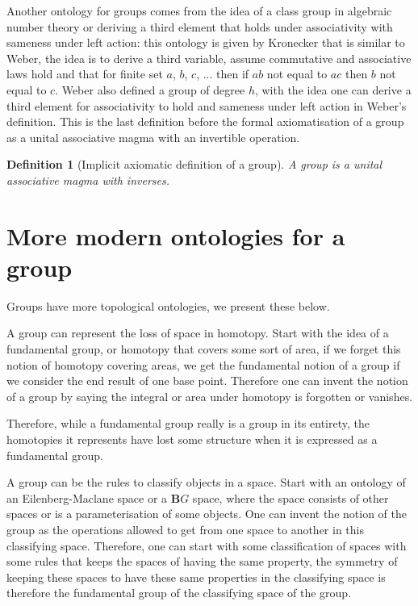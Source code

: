 \documentclass{tufte-book}
\newtheorem{definition}[theorem]{Definition}
\begin{document}
Another ontology for groups comes from the idea of a class group in algebraic number theory or deriving a third element that holds under associativity with sameness under left action: this ontology is given by Kronecker that is similar to Weber, the idea is to derive a third variable, assume commutative and associative laws hold and that for finite set $a$, $b$, $c$, ... then if $ab$ not equal to $ac$ then $b$ not equal to $c$. Weber also defined a group of degree $h$, with the idea one can derive a third element for associativity to hold and sameness under left action in Weber's definition. This is the last definition before the formal axiomatisation of a group as a unital associative magma with an invertible operation.

\begin{definition}[Implicit axiomatic definition of a group]
  A group is a unital associative magma with inverses.
\end{definition}

\section{More modern ontologies for a group}

Groups have more topological ontologies, we present these below.

A group can represent the loss of space in homotopy. Start with the idea of a fundamental group, or homotopy that covers some sort of area, if we forget this notion of homotopy covering areas, we get the fundamental notion of a group if we consider the end result of one base point. Therefore one can invent the notion of a group by saying the integral or area under homotopy is forgotten or vanishes.

Therefore, while a fundamental group really is a group in its entirety, the homotopies it represents have lost some structure when it is expressed as a fundamental group.

A group can be the rules to classify objects in a space. Start with an ontology of an Eilenberg-Maclane space or a $\mathbf{B}G$ space, where the space consists of other spaces or is a parameterisation of some objects. One can invent the notion of the group as the operations allowed to get from one space to another in this classifying space. Therefore, one can start with some classification of spaces with some rules that keeps the spaces of having the same property, the symmetry of keeping these spaces to have these same properties in the classifying space is therefore the fundamental group of the classifying space of the group.
\end{document}
